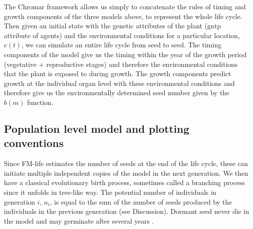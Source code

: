 \documentclass[phd]{infthesis}
\newcommand{\mr}[1]{\mathrm{#1}}
\begin{document}
The Chromar framework allows us simply to concatenate the rules of
timing and growth components of the three models above, to represent the
whole life cycle. Then given an initial state with the genetic
attributes of the plant (\(\mr{gntp}\) attribute of agents) and the
environmental conditions for a particular location, \(e(t)\), we can
simulate an entire life cycle from seed to seed. The timing components
of the model give us the timing within the year of the growth period
(vegetative + reproductive stages) and therefore the environmental
conditions that the plant is exposed to during growth. The growth
components predict growth at the individual organ level with these
environmental conditions and therefore give us the environmentally
determined seed number given by the \(b(m)\) function.

\subsection{Population level model and plotting
  conventions}
\label{population-level-model-and-plotting-conventions}

Since FM-life estimates the number of seeds at the end of the life
cycle, these can initiate multiple independent copies of the model in
the next generation. We then have a classical evolutionary birth
process, sometimes called a branching process since it unfolds in
tree-like way. The potential number of individuals in generation \(i\),
\(n_{i}\), is equal to the sum of the number of seeds produced by the
individuals in the previous generation (see Discussion). Dormant seed
never die in the model and may germinate after several years \citep{burghardt_modeling_2015}.
\end{document}
